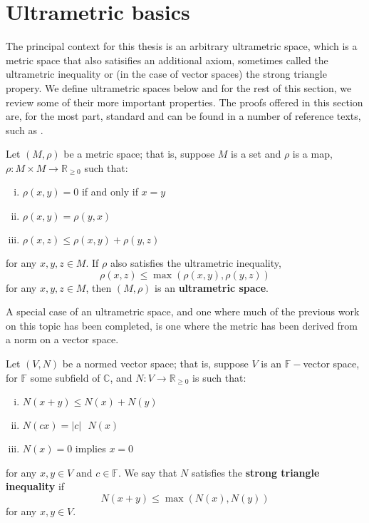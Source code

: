 \section{Ultrametric basics}

The principal context for this thesis is an arbitrary ultrametric space, which is a metric space that also satisifies an additional axiom, sometimes called the ultrametric inequality or (in the case of vector spaces) the strong triangle propery. We define  ultrametric spaces below and for the rest of this section, we review some of their more important properties. The proofs offered in this section are, for the most part, standard and can be found in a number of reference texts, such as \cite{ar}.\\

\begin{definition}
	 Let $(M, \rho)$ be a metric space; that is, suppose $M$ is a set and $\rho$ is a map, $\rho: M \times M \rightarrow \mathbb{R}_{\geq 0}$ such that:
	\begin{enumerate}[(i)]
		\item $\rho(x,y) = 0$ if and only if $x=y$
		\item $\rho(x,y) = \rho(y,x)$
		\item $\rho(x,z) \leq \rho(x,y) + \rho(y,z)$
	\end{enumerate}
	for any $x,y,z \in M$. If $\rho$ also satisfies the ultrametric inequality,	
		\[ \rho(x,z) \leq \max{(\rho(x,y), \rho(y,z))}\]
for any $x,y,z \in M$, then $(M, \rho)$ is an \textbf{ultrametric space}.
\end{definition}

A special case of an ultrametric space, and one where much of the previous work on this topic has been completed, is one where the metric has been derived from a norm on a vector space. \\

\begin{definition}
	 Let $(V, N)$ be a normed vector space; that is, suppose $V$ is an $\mathbb{F-}$vector space, for $\mathbb{F}$ some subfield of $\mathbb{C}$, and $N: V \rightarrow \mathbb{R}_{\geq 0}$  is such that:
	\begin{enumerate}[(i)]
		\item $N(x +y ) \leq N(x) + N(y)$
		\item $N(cx) = \lvert c \rvert \text{ } N(x)$
		\item $N(x) = 0$ implies $x=0$
	\end{enumerate}
	for any $x,y \in V$ and $c \in \mathbb{F}$. We say that $N$ satisfies the \textbf{strong triangle inequality} if
	\[ N(x + y) \leq \max(N(x), N(y)) \]
	for any $x,y \in V$.
\end{definition}

